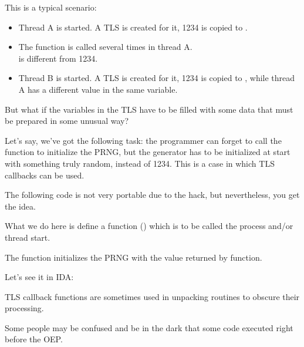 This is a typical scenario:

\begin{itemize}
\item Thread A is started. A \ac{TLS} is created for it, 1234 is copied to .

\item The  function is called several times in thread A.\\
 is different from 1234.

\item Thread B is started. A \ac{TLS} is created for it, 1234 is copied to , 
while thread A has a different value in the same variable.
\end{itemize}


But what if the variables in the \ac{TLS} have to be filled with some data that must be prepared in some unusual way?

Let's say, we've got the following task:
the programmer can forget to call the  function to initialize the \ac{PRNG}, but the generator has to be 
initialized at start with something truly random, instead of 1234.
This is a case in which \ac{TLS} callbacks can be used.

The following code is not very portable due to the hack, but nevertheless, you get the idea.

What we do here is define a function () which is to be called  
the process and/or thread start.

The function initializes the \ac{PRNG} with the value returned by  function.



Let's see it in IDA:



TLS callback functions are sometimes used in unpacking routines to obscure their processing.

Some people may be confused and be in the dark that some code executed right before the \ac{OEP}.
